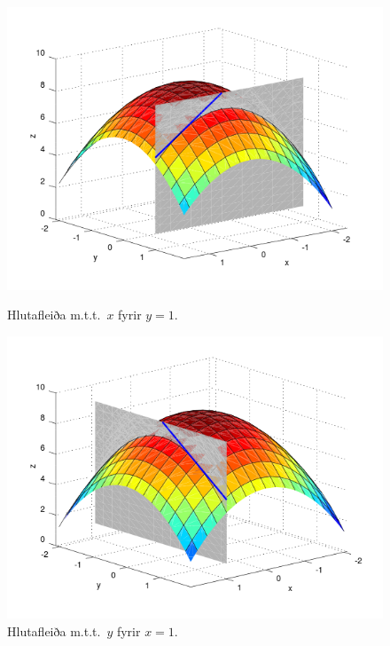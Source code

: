  \begin{figure}[!h]
        \centering
        \begin{minipage}{.5\textwidth}
            \centering
            \includegraphics[width=1\linewidth]{xpart.png}
            \caption*{Hlutafleiða m.t.t.~$x$ fyrir $y=1$.}
        \end{minipage}%
        \begin{minipage}{.5\textwidth}
            \centering
            \includegraphics[width=1\linewidth]{ypart.png}
            \caption*{Hlutafleiða m.t.t.~$y$ fyrir $x=1$.}
        \end{minipage}
    \end{figure}
 


